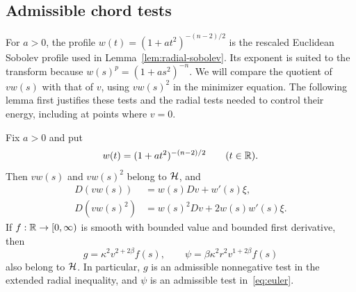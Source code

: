 \subsection{Admissible chord tests}

For $a>0$, the profile $w(t)=(1+at^2)^{-(n-2)/2}$ is the rescaled
Euclidean Sobolev profile used in Lemma~\ref{lem:radial-sobolev}.
Its exponent is suited to the transform because
$w(s)^p=(1+as^2)^{-n}$. We will compare the quotient of $vw(s)$
with that of $v$, using $vw(s)^2$ in the minimizer equation.
The following lemma first justifies these tests and the radial tests
needed to control their energy, including at points where $v=0$.

\begin{lemma}\label{lem:chord-tests}
Fix $a>0$ and put
\[
 w(t)=(1+at^2)^{-(n-2)/2}\qquad(t\in\mathbb R).
\]
Then $vw(s)$ and $vw(s)^2$ belong to $\mathcal H$, and
\begin{equation}\label{chord:product-rules}
 \begin{split}
 D(vw(s))&=w(s)Dv+w'(s)\xi,\\
 D(vw(s)^2)&=w(s)^2Dv+2w(s)w'(s)\xi.
 \end{split}
\end{equation}
If $f:\mathbb R\to[0,\infty)$ is smooth with bounded value and bounded
first derivative, then
\begin{equation}\label{chord:radial-tests}
 g=\kappa^2v^{2+2\beta}f(s),\qquad
 \psi=\beta\kappa^2r^2v^{1+2\beta}f(s)
\end{equation}
also belong to $\mathcal H$. In particular, $g$ is an admissible
nonnegative test in the extended radial inequality, and $\psi$
is an admissible test in~\eqref{eq:euler}.
\end{lemma}

